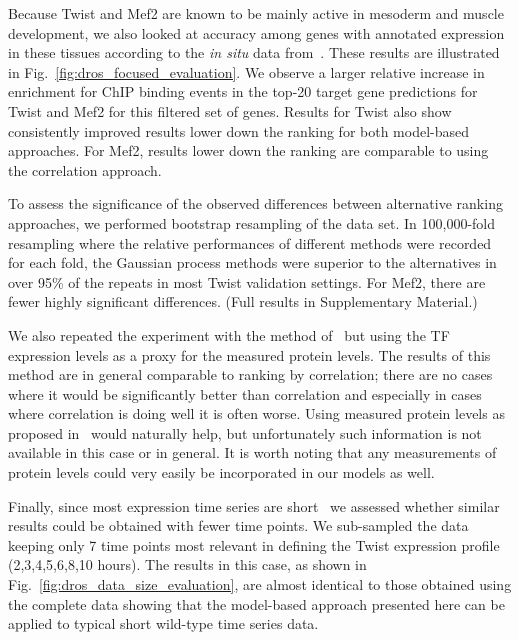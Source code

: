 \documentclass{pnastwo}
\begin{document}
\begin{article}
Because Twist and Mef2 are known to be mainly active in mesoderm and
muscle development, we also looked at accuracy among genes
with annotated expression in these tissues according to the
\emph{in situ} data from~\cite{Tomancak2002}. These results are illustrated in Fig.~\ref{fig:dros_focused_evaluation}. We observe a larger relative increase in enrichment for ChIP binding events in the top-20 target gene predictions for Twist and Mef2 for this filtered set of genes. Results for Twist also show consistently improved results lower down the ranking for both model-based approaches. For Mef2, results lower down the ranking are comparable to using the correlation approach.


To assess the significance of the observed differences between alternative ranking approaches, we performed bootstrap
resampling of the data set.  In 100,000-fold resampling where the
relative performances of different methods were recorded for each
fold, the Gaussian process methods were superior to the alternatives
in over 95\% of the repeats in most Twist validation settings.
For Mef2, there are fewer highly significant differences.
(Full results in Supplementary Material.)

We also repeated the experiment with the method of~\cite{Gatta2008}
but using the TF expression levels as a proxy for the measured protein
levels.  The results of this method are in general comparable to
ranking by correlation; there are no cases where it would be
significantly better than correlation and especially in cases where
correlation is doing well it is often worse.
Using measured protein levels as proposed in~\cite{Gatta2008} would
naturally help, but unfortunately such information is not available in
this case or in general.  It is worth noting that any measurements of
protein levels could very easily be incorporated in our models as well.

Finally, since most expression time series are short~\cite{Ernst2005}
we assessed whether similar results could be obtained with fewer time
points. We sub-sampled the data keeping only 7 time points most
relevant in defining the Twist expression profile
(2,3,4,5,6,8,10 hours). The results in this case, as shown in
Fig.~\ref{fig:dros_data_size_evaluation}, are almost identical to 
those obtained using the complete data showing that the model-based
approach presented here can be applied to typical short wild-type time
series data.


\end{article}
\end{document}
